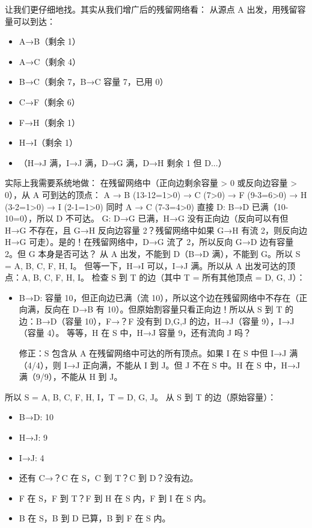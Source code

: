 \documentclass[10pt,a4paper,openany]{ctexbook}
\theoremstyle{definition}
\theoremstyle{remark}
\begin{document}
让我们更仔细地找。其实从我们增广后的残留网络看：
从源点 A 出发，用残留容量可以到达：
\begin{itemize}
\item A→B（剩余 1）
\item A→C（剩余 4）
\item B→C（剩余 7，B→C 容量 7，已用 0）
\item C→F（剩余 6）
\item F→H（剩余 1）
\item H→I（剩余 1）
\item （H→J 满，I→J 满，D→G 满，D→H 剩余 1 但 D...）

\end{itemize}

实际上我需要系统地做：
在残留网络中（正向边剩余容量 > 0 或反向边容量 > 0），从 A 可到达的顶点：
A → B (13-12=1>0) → C (7>0) → F (9-3=6>0) → H (3-2=1>0) → I (2-1=1>0)
同时 A → C (7-3=4>0) 直接
D: B→D 已满（10-10=0），所以 D 不可达。
G: D→G 已满，H→G 没有正向边（反向可以有但 H→G 不存在，且 G→H 反向边容量 2？残留网络中如果 G→H 有流 2，则反向边 H→G 可走）。是的！在残留网络中，D→G 流了 2，所以反向 G→D 边有容量 2。但 G 本身是否可达？
从 A 出发，不能到 D（B→D 满），不能到 G。所以 S = {A, B, C, F, H, I}。
但等一下，H→I 可以，I→J 满。所以从 A 出发可达的顶点：{A, B, C, F, H, I}。
检查 S 到 T 的边（其中 T = 所有其他顶点 = {D, G, J}）：
\begin{itemize}
\item B→D: 容量 10，但正向边已满（流 10），所以这个边在残留网络中不存在（正向满，反向在 D→B 有 10）。但原始割容量只看正向边！所以从 S 到 T 的边：B→D（容量 10），F→？F 没有到 D,G,J 的边，H→J（容量 9），I→J（容量 4）。
等等，H 在 S 中，H→J 容量 9，还有流向 J 吗？


修正：S 包含从 A 在残留网络中可达的所有顶点。如果 I 在 S 中但 I→J 满（4/4），则 I→J 正向满，不能从 I 到 J。但 J 不在 S 中。H 在 S 中，H→J 满（9/9），不能从 H 到 J。


\end{itemize}

所以 S = {A, B, C, F, H, I}，T = {D, G, J}。
从 S 到 T 的边（原始容量）：
\begin{itemize}
\item B→D: 10
\item H→J: 9
\item I→J: 4
\item 还有 C→？C 在 S，C 到 T？C 到 D？没有边。
\item F 在 S，F 到 T？F 到 H 在 S 内，F 到 I 在 S 内。
\item B 在 S，B 到 D 已算，B 到 F 在 S 内。

\end{itemize}
\end{document}
